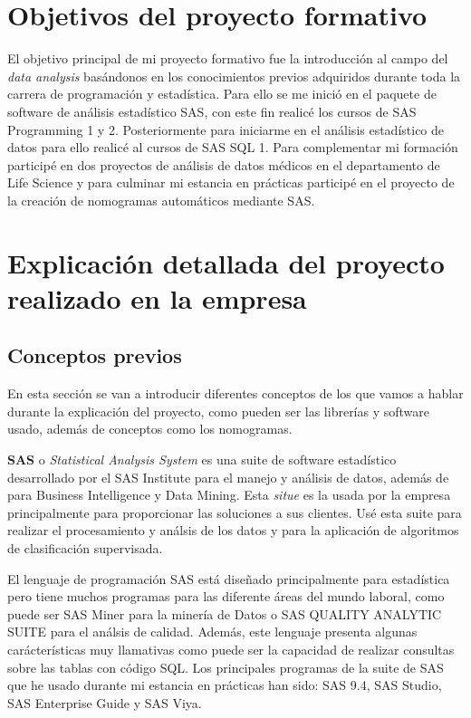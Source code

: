 \documentclass[pdftex,11pt,a4paper]{book}
\begin{document}
\section{Objetivos del proyecto formativo}

El objetivo principal de mi proyecto formativo fue la introducción al campo del \textit{data analysis} basándonos en los conocimientos previos adquiridos durante toda la carrera de programación y estadística. Para ello se me inició en el paquete de software de análisis estadístico SAS, con este fin realicé los cursos de SAS Programming 1 y 2. Posteriormente para iniciarme en el análisis estadístico de datos para ello realicé al cursos de SAS SQL 1.
Para complementar mi formación participé en dos proyectos de análisis de datos médicos en el departamento de Life Science y para culminar mi estancia en prácticas participé en el proyecto de la creación de nomogramas automáticos mediante SAS. 


\section{ Explicación detallada del proyecto realizado en la empresa}

\subsection{Conceptos previos}
En esta sección se van a introducir diferentes conceptos de los que vamos a hablar durante la explicación del proyecto, como pueden ser las librerías y software usado, además de conceptos como los nomogramas.


 \textbf{SAS} o \textit{Statistical Analysis System} es una suite de software estadístico desarrollado por el SAS Institute para el manejo y análisis de datos, además de para Business Intelligence y Data Mining. Esta \textit{situe} es la usada por la empresa principalmente para proporcionar las soluciones a sus clientes. Usé esta suite para realizar el procesamiento y análsis de los datos y para la aplicación de algoritmos de clasificación supervisada. 

El lenguaje de programación SAS está diseñado principalmente para estadística pero tiene muchos programas para las diferente áreas del mundo laboral, como puede ser SAS Miner para la minería de Datos o SAS QUALITY ANALYTIC SUITE para el análsis de calidad. Además, este lenguaje presenta algunas carácterísticas muy llamativas como puede ser la capacidad de realizar consultas sobre las tablas con código SQL. Los principales programas de la suite de SAS que he usado durante mi estancia en prácticas han sido: SAS 9.4, SAS Studio, SAS Enterprise Guide y SAS Viya.
\end{document}
